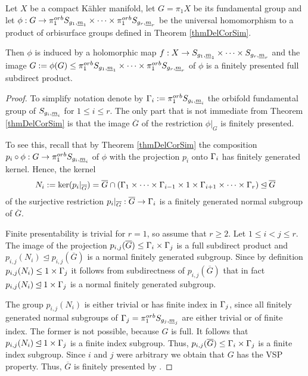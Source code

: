 \begin{lemma}
 Let $X$ be a compact K\"ahler manifold, let $G=\pi_1X$ be its fundamental group and let $\phi: G \rightarrow \pi_1^{orb} S_{g_1,{\underline{m}}_1} \times \dots \times \pi_1 ^{orb} S_{g_r,{\underline{m}}_r}$ be the universal homomorphism to a product of orbisurface groups defined in Theorem \ref{thmDelCorSim}. 
 
 Then $\phi$ is induced by a holomorphic map $f: X\rightarrow S_{g_1,{\underline{m}}_1} \times \dots \times S_{g_r,{\underline{m}}_r}$ and the image $G:=\phi(G)\leq \pi_1^{orb} S_{g_1,{\underline{m}}_1} \times \dots \times \pi_1^{orb} S_{g_r,{\underline{m}}_r}$ of $\phi$ is a finitely presented full subdirect product. 
 \label{lemUnivFinPres}
\end{lemma}
\begin{proof}
To simplify notation denote by $\Gamma_i:= \pi_1^{orb} S_{g_i,{\underline{m}}_i}$ the orbifold fundamental group of $S_{g_i,{\underline{m}}_i}$ for $1\leq i \leq r$. The only part that is not immediate from Theorem \ref{thmDelCorSim} is that the image $\overline{G}$ of the restriction $\phi|_{G}$ is finitely presented. 

To see this, recall that by Theorem \ref{thmDelCorSim} the composition $p_i\circ \phi: G\rightarrow \pi_1^{orb} S_{g_i,{\underline{m}}_i}$ of $\phi$ with the projection $p_i$ onto $\Gamma_i$ has finitely generated kernel. Hence, the kernel 
 \[
 N_i:={\rm{ker}} (p_i|_{\overline{G}}) = \overline{G} \cap \left( \Gamma_1 \times \dots \times \Gamma_{i-1}\times 1 \times \Gamma_{i+1} \times \dots \times \Gamma_r\right)\unlhd \overline{G}
 \]
of the surjective restriction $p_i|_{\overline{G}} : \overline{G} \rightarrow \Gamma_i$ is a finitely generated normal subgroup of $\overline{G}$. 

Finite presentability is trivial for $r=1$, so assume that $r\geq 2$. Let $1\leq i < j \leq r$. The image of the projection $p_{i,j}(\overline{G}) \leq \Gamma_i \times \Gamma_j$ is a full subdirect product and $p_{i,j}(N_i)\unlhd p_{i,j}(\overline{G})$ is a normal finitely generated subgroup. Since by definition $p_{i,j}(N_i)\leq 1\times \Gamma_j$ it follows from subdirectness of $p_{i,j}(\overline{G})$ that in fact $p_{i,j}(N_i)\unlhd 1 \times \Gamma_j$ is a normal finitely generated subgroup. 

The group $p_{i,j}(N_i)$ is either trivial or has finite index in $\Gamma_j$, since all finitely generated normal subgroups of $\Gamma_j=\pi_1^{orb} S_{g_j,{\underline{m}}_j}$ are either trivial or of finite index. The former is not possible, because $G$ is full. It follows that $p_{i,j}(N_i)\unlhd 1 \times \Gamma_j$ is a finite index subgroup. Thus, $p_{i,j}(\overline{G}) \leq \Gamma_i \times \Gamma_j$ is a finite index subgroup. Since $i$ and $j$ were arbitrary we obtain that $G$ has the VSP property. Thus, $\overline{G}$ is finitely presented by \cite[Theorem A]{BriHowMilSho-13}.
\end{proof}

